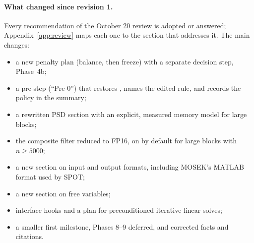 \documentclass[11pt]{article}
\begin{document}
\paragraph{What changed since revision 1.} Every recommendation of the October 20 review \cite{review20}
is adopted or answered; Appendix~\ref{app:review} maps each one to the section that addresses it. The
main changes:
\begin{itemize}
  \item a new penalty plan (balance, then freeze) with a separate decision step, Phase~4b;
  \item a pre-step (``Pre-0'') that restores , names the edited rule, and records the
  policy in the summary;
  \item a rewritten PSD section with an explicit, measured memory model for large blocks;
  \item the composite filter reduced to FP16, on by default for large blocks with $n\ge5000$;
  \item a new section on input and output formats, including MOSEK's MATLAB format used by SPOT;
  \item a new section on free variables;
  \item interface hooks and a plan for preconditioned iterative linear solves;
  \item a smaller first milestone, Phases 8--9 deferred, and corrected facts and citations.
\end{itemize}
\end{document}
